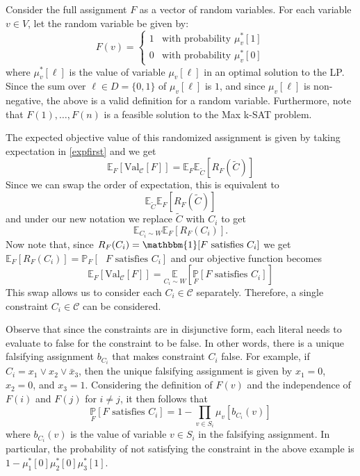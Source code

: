 Consider the full assignment $F$ as a vector of random variables. For each variable $v \in V$, let the random variable be given by:
\[
	F(v) = \begin{cases}
	1 & \text{with probability } \mu^*_v[1]\\
	0 & \text{with probability } \mu^*_v[0]
	\end{cases}
\]
where $\mu^*_v[\ell]$ is the value of variable $\mu_v[\ell]$ in an optimal solution to the LP.
Since the sum over $\ell \in D = \{0,1\}$ of  $\mu_v[\ell]$ is $1$, and since $\mu_v[\ell]$ is non-negative, the above is a valid definition for a random variable. 
Furthermore, note that $F(1), \dots, F(n)$ is a feasible solution to the Max k-SAT problem.

The expected objective value of this randomized assignment is given by taking expectation in \ref{expfirst} and we get
\[
	\mathbb{E}_F  \left[\text{Val}_{\mathcal{C}}[F] \right]= \mathbb{E}_F \mathbb{E}_{\tilde{C}}\left[R_F(\tilde{C})\right]
\]
Since we can swap the order of expectation, this is equivalent to
\[
	 \mathbb{E}_{\tilde{C}} \mathbb{E}_F \left[R_F(\tilde{C})\right]
\]
and under our new notation we replace $\tilde{C}$ with $C_i$ to get 
\[
	 \mathbb{E}_{C_i \sim W} \mathbb{E}_F \left[R_F(C_i)\right].
\]
Now note that, since $R_F(C_i) = \mathbbm{1} [\mbox{$F$ satisfies $C_i$]}$ we get $\mathbb{E}_F \left[R_F(C_i)\right] = \mathbb{P}_F [\mbox{ $F$ satisfies $C_i$}]$ and our objective function becomes
\[
\mathbb{E}_F  \left[\text{Val}_{\mathcal{C}}[F] \right] = \underset{C_i \sim W}{\mathbb{E}}\left[ \underset{F}{\mathbb{P}}[F \text{ satisfies } C_i] \right]
\]
This swap allows us to consider each $C_i \in \mathcal{C}$ separately.
Therefore, a single constraint $C_i \in \mathcal{C}$ can be considered.

Observe that since the constraints are in disjunctive form, each literal needs to evaluate to false for the constraint to be false. 
In other words, there is a unique falsifying assignment $b_{C_i}$ that makes constraint $C_i$ false. 
For example, if $C_i = x_1 \vee x_2 \vee \bar{x}_3$, then the unique falsifying assignment is given by $x_1 = 0$, $x_2 = 0$, and $x_3 = 1$. 
Considering the definition of $F(v)$ and the independence of $F(i)$ and $F(j)$ for $i \neq j$, it then follows that 
\begin{equation}
		\underset{F}{\mathbb{P}}[ F \text{ satisfies } C_i] = 1 - \prod_{v \in S_i} \mu_v[b_{C_i}(v)] \label{eq:objectiveRounding}
\end{equation}
where $b_{C_i}(v)$ is the value of variable $v \in S_i$ in the falsifying assignment. 
In particular, the probability of not satisfying the constraint in the above example is $ 1- \mu_1^*[0] \mu_2^*[0] \mu_3^*[1]$.

